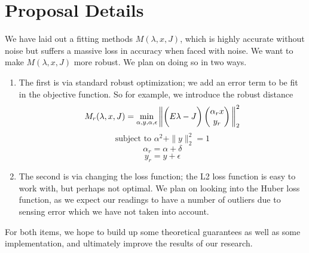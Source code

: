 \section{Proposal Details}
We have laid out a fitting methods $M(\lambda, x, J)$, which is highly accurate without noise but suffers a massive loss in accuracy when faced with noise. We want to make $M(\lambda, x, J)$ more robust. We plan on doing so in two ways. 
\begin{enumerate}
\item The first is via standard robust optimization; we add an error term to be fit in the objective function. So for example, we introduce the robust distance
\begin{equation}
M_r(\lambda, x, J) = \min_{\alpha, y, \alpha, \epsilon} \bigg{ \| } \bigg{(}E {\lambda} - J\bigg{)}
\begin{pmatrix}
\alpha_r x \\
y_r
\end{pmatrix}
     \bigg{ \| }_2^2
\end{equation}
$$ \text{subject to } \alpha^2 + \|y\|_2^2 = 1$$
$$ \alpha_r = \alpha + \delta$$
$$ y_r = y + \epsilon$$

\item The second is via changing the loss function; the L2 loss function is easy to work with, but perhaps not optimal. We plan on looking into the Huber loss function, as we expect our readings to have a number of outliers due to sensing error which we have not taken into account. 
\end{enumerate}
For both items, we hope to build up some theoretical guarantees as well as some implementation, and ultimately improve the results of our research.

